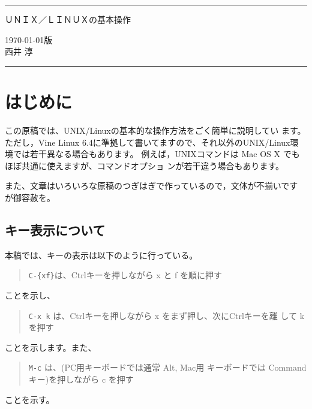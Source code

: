 \documentclass{jreport}
\begin{document}
\pagestyle{empty}
\noindent
\rule{\linewidth}{1pt}
\begin{center}
  {\Huge\gtfamily ＵＮＩＸ／ＬＩＮＵＸの基本操作}
\end{center}
\begin{flushright}
\today 版\\
西井 淳
\end{flushright}
\rule{\linewidth}{1pt}

\newpage
{}
\setcounter{page}{1}
\tableofcontents

\newpage
{}
\setcounter{page}{1}
\pagestyle{fancy}

\chapter*{はじめに}

この原稿では、UNIX/Linuxの基本的な操作方法をごく簡単に説明してい
ます。
ただし，Vine Linux 6.4に準拠して書いてますので、それ以外のUNIX/Linux環
境では若干異なる場合もあります。
例えば，UNIXコマンドは Mac OS X でもほぼ共通に使えますが、コマンドオプショ
ンが若干違う場合もあります。

また、文章はいろいろな原稿のつぎはぎで作っているので，文体が不揃いです
が御容赦を。



\section*{キー表示について}

本稿では、キーの表示は以下のように行っている。
\begin{quote}
  \verb|C-{xf}|は、Ctrlキーを押しながら x と f を順に押す
\end{quote}
ことを示し、
\begin{quote}
  \verb|C-x k| は、Ctrlキーを押しながら x をまず押し、次にCtrlキーを離
  して k を押す
\end{quote}
ことを示します。また、
\begin{quote}
  \verb|M-c| は、(PC用キーボードでは通常 Alt, Mac用
  キーボードでは Command キー)を押しながら c を押す
\end{quote}
ことを示す。
\end{document}
